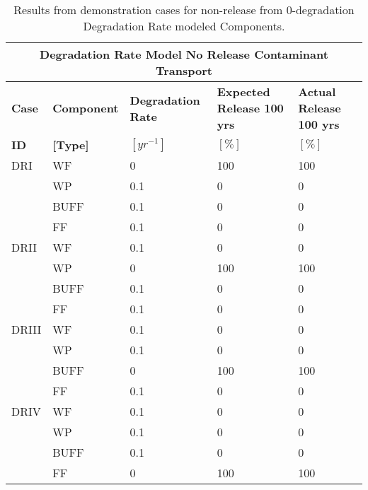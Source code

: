 \begin{table}[htp!]
\centering
\footnotesize{
\begin{tabularx}{\textwidth}{|X|X|X|X|X|}
  \multicolumn{5}{c}{\textbf{Degradation Rate Model No Release Contaminant Transport}}\\
  \hline
  \textbf{Case}  &  \textbf{Component} &  \textbf{Degradation Rate} & \textbf{Expected Release 100 yrs} & \textbf{Actual Release 100 yrs}\\
  \textbf{ID}    & \textbf{[Type]} &  \textbf{$[yr^{-1}]$}  &  $[\%]$  & $[\%]$\\
  \hline
  DRI     &  WF    &  0   & 100 & 100\\
          &  WP    &  0.1 & 0 & 0 \\
          &  BUFF  &  0.1 & 0 & 0 \\
          &  FF    &  0.1 & 0 & 0\\
  \hline
  DRII    &  WF    &  0.1 & 0 & 0\\
          &  WP    &  0   & 100 & 100\\
          &  BUFF  &  0.1 & 0 & 0\\
          &  FF    &  0.1 & 0 & 0\\
  \hline
  DRIII   &  WF    &  0.1 & 0 & 0\\
          &  WP    &  0.1 & 0 & 0\\
          &  BUFF  &  0   & 100 & 100\\
          &  FF    &  0.1 & 0 & 0\\
  \hline
  DRIV    &  WF    &  0.1 & 0 & 0\\
          &  WP    &  0.1 & 0 & 0\\
          &  BUFF  &  0.1 & 0 & 0\\
          &  FF    &  0   & 100 & 100\\
  \hline
\end{tabularx}
\caption[Degradation rate model no release problem results.]{Results from demonstration cases for non-release from 0-degradation Degradation Rate modeled Components.}
\label{tab:dr_base}
}
\end{table}
